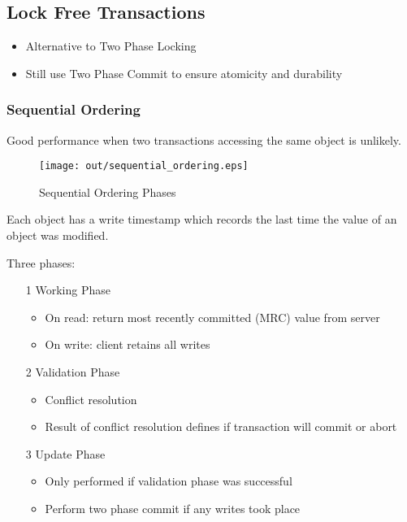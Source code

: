 \documentclass[a4paper]{article}
\begin{document}
\subsection{Lock Free Transactions}

\begin{itemize}
  \item Alternative to Two Phase Locking
  \item Still use Two Phase Commit to ensure atomicity and durability
\end{itemize}

\subsubsection{Sequential Ordering}

Good performance when two transactions accessing the same object is unlikely.

\begin{figure}[h!]
  \centering
  \texttt{[image: out/sequential\_ordering.eps]}
  \caption{Sequential Ordering Phases}
  \label{fig:sequential_ordering}
\end{figure}
\FloatBarrier

Each object has a write timestamp which records the last time the value of an
object was modified.

Three phases:

\begin{enumerate}
  \item[1] Working Phase
    \begin{itemize}
      \item On read: return most recently committed (MRC) value from server
      \item On write: client retains all writes
    \end{itemize}

  \item[2] Validation Phase
    \begin{itemize}
      \item Conflict resolution
      \item Result of conflict resolution defines if transaction will commit or
            abort
    \end{itemize}

  \item[3] Update Phase
    \begin{itemize}
      \item Only performed if validation phase was successful
      \item Perform two phase commit if any writes took place
    \end{itemize}

\end{enumerate}
\end{document}
